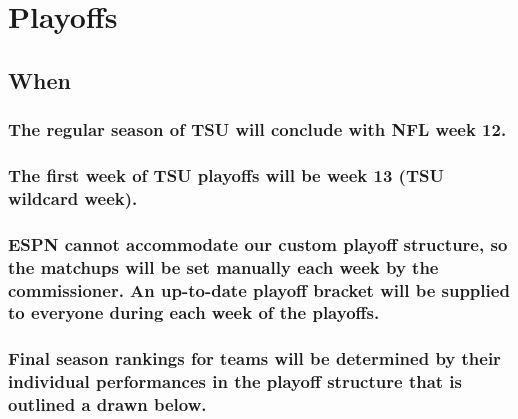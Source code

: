 \documentclass[
]{book}
\begin{document}
\hypertarget{playoffs}{%
\chapter{Playoffs}\label{playoffs}}

\hypertarget{when}{%
\section{When}\label{when}}

\hypertarget{the-regular-season-of-tsu-will-conclude-with-nfl-week-12.}{%
\subsection{The regular season of TSU will conclude with NFL week 12.}\label{the-regular-season-of-tsu-will-conclude-with-nfl-week-12.}}

\hypertarget{the-first-week-of-tsu-playoffs-will-be-week-13-tsu-wildcard-week.}{%
\subsection{The first week of TSU playoffs will be week 13 (TSU wildcard week).}\label{the-first-week-of-tsu-playoffs-will-be-week-13-tsu-wildcard-week.}}

\hypertarget{espn-cannot-accommodate-our-custom-playoff-structure-so-the-matchups-will-be-set-manually-each-week-by-the-commissioner.-an-up-to-date-playoff-bracket-will-be-supplied-to-everyone-during-each-week-of-the-playoffs.}{%
\subsection{ESPN cannot accommodate our custom playoff structure, so the matchups will be set manually each week by the commissioner. An up-to-date playoff bracket will be supplied to everyone during each week of the playoffs.}\label{espn-cannot-accommodate-our-custom-playoff-structure-so-the-matchups-will-be-set-manually-each-week-by-the-commissioner.-an-up-to-date-playoff-bracket-will-be-supplied-to-everyone-during-each-week-of-the-playoffs.}}

\hypertarget{final-season-rankings-for-teams-will-be-determined-by-their-individual-performances-in-the-playoff-structure-that-is-outlined-a-drawn-below.}{%
\subsection{Final season rankings for teams will be determined by their individual performances in the playoff structure that is outlined a drawn below.}\label{final-season-rankings-for-teams-will-be-determined-by-their-individual-performances-in-the-playoff-structure-that-is-outlined-a-drawn-below.}}
\end{document}
